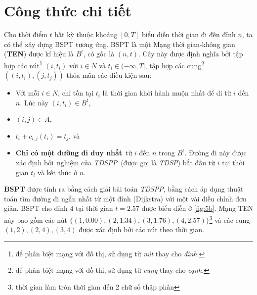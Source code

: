 \documentclass[../main.tex]{subfiles}
\begin{document}
\section{Công thức chi tiết}\label{cong-thuc1}

Cho thời điểm \(t\) bất kỳ thuộc khoảng \([0, T]\) biểu diễn thời gian
đi đến đỉnh \(n\), ta có thể xây dựng BSPT tương ứng. BSPT là một Mạng
thời gian-không gian (\textbf{TEN}) được kí hiệu là \(B^t\), có gốc là
\((n, t)\). Cây này được định nghĩa bởi tập hợp các nút\footnote{để phân
  biệt mạng với đồ thị, sử dụng từ \emph{nút} thay cho \emph{đỉnh}.} \((i, t_i)\)
với \(i \in N\) và \(t_i \in (-\infty, T]\), tập hợp các cung\footnote{để
  phân biệt mạng với đồ thị, sử dụng từ \emph{cung} thay cho \emph{cạnh}.}
\(((i, t_i), (j, t_j))\) thỏa mãn các điều kiện sau: 

\begin{itemize}
\tightlist
\item
  Với mỗi \(i\in N\), chỉ tồn tại \(t_i\) là thời gian khởi hành muộn
  nhất để đi từ \(i\) đến \(n\). Lúc này \((i, t_i)\in B^t\),
\item
  \((i, j) \in A\),
\item
  \(t_i + c_{i, j}(t_i) = t_j\), và
\item
  \textbf{Chỉ có một đường đi duy nhất}~từ \(i\) đến \(n\) trong
  \(B^t\). Đường đi này được xác định bởi~nghiệm của \emph{TDSPP}~(được
  gọi là \emph{TDSP}) bắt đầu từ \(i\) tại thời gian \(t_i\) và kết thúc
  ở \(n\).
\end{itemize}

\textbf{BSPT} được tính ra
bằng cách giải bài toán \emph{TDSPP}, bằng cách áp dụng thuật toán tìm đường 
đi ngắn nhất từ một đỉnh (Dijkstra)
với một vài điều chỉnh đơn giản. BSPT cho đỉnh \(4\) tại thời gian
\(t=2.57\) được biểu diễn ở \autoref{fig:5b}. Mạng TEN này bao gồm các nút
\(\{(1, 0.00), (2, 1.34), (3, 1.76), (4, 2.57)\}\)\footnote{thời gian
  làm tròn thời gian đến 2 chữ số thập phân} và các cung
\((1, 2), (2, 4), (3, 4)\) được xác định bởi các nút theo thời gian.
\end{document}
